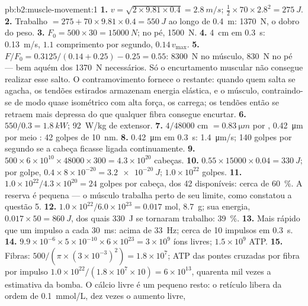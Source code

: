 \begin{solution}{pb:b2:muscle-movement:1}
\textbf{1.} $v = \sqrt{2\times 9.81\times 0.4} = \qty{2.8}{m/s}$;
$\tfrac12\times 70\times 2.8^{2} = \qty{275}{J}$.
\textbf{2.} Trabalho $= 275 + 70\times 9.81\times 0.4 = \qty{550}{J}$
ao longo de \qty{0.4}{m}: \qty{1370}{N}, o dobro do peso.
\textbf{3.} $F_0 = 500\times 30 = \qty{15000}{N}$; no pé,
\qty{1500}{N}.
\textbf{4.} \qty{4}{cm} em \qty{0.3}{s}: \qty{0.13}{m/s}, $1.1$
comprimento por segundo, $0.14\,v_{\max}$.
\textbf{5.} $F/F_0 = 0.3125/(0.14 + 0.25) - 0.25 = 0.55$: \qty{8300}{N}
no músculo, \qty{830}{N} no pé --- bem aquém dos \qty{1370}{N}
necessários. Só o encurtamento muscular não consegue realizar esse
salto. O contramovimento fornece o restante: quando quem salta se
agacha, os tendões estirados armazenam energia elástica, e o músculo,
contraindo-se de modo quase isométrico com alta força, os carrega; os
tendões então se retraem mais depressa do que qualquer fibra consegue
encurtar.
\textbf{6.} $550/0.3 = \qty{1.8}{kW}$; \qty{92}{W/kg} de extensor.
\textbf{7.} $4/\num{48000}$ cm $= \qty{0.83}{\micro m}$ por ,
\qty{0.42}{\micro m} por meio : 42 golpes de \qty{10}{nm}.
\textbf{8.} \qty{0.42}{\micro m} em \qty{0.3}{s}: \qty{1.4}{\micro m/s};
140 golpes por segundo se a cabeça ficasse ligada continuamente.
\textbf{9.} $500\times 6\times 10^{10}\times \num{48000}\times 300 =
4.3\times 10^{20}$ cabeças.
\textbf{10.} $0.55\times \num{15000}\times 0.04 = \qty{330}{J}$; por
golpe, $0.4\times 8\times 10^{-20} = \qty{3.2e-20}{J}$; $1.0\times
10^{22}$ golpes.
\textbf{11.} $1.0\times 10^{22}/4.3\times 10^{20} = 24$ golpes por
cabeça, dos 42 disponíveis: cerca de \qty{60}{\%}. A reserva é pequena
--- o músculo trabalha perto de seu limite, como constatou a questão 5.
\textbf{12.} $1.0\times 10^{22}/6.0\times 10^{23} = 0.017$ mol,
\qty{8.7}{g}; sua energia, $0.017\times 50 = \qty{860}{J}$, dos quais
\qty{330}{J} se tornaram trabalho: \qty{39}{\%}.
\textbf{13.} Mais rápido que um impulso a cada \qty{30}{ms}: acima de
\qty{33}{Hz}; cerca de 10 impulsos em \qty{0.3}{s}.
\textbf{14.} $9.9\times 10^{-6}\times 5\times 10^{-10}\times 6\times
10^{23} = 3\times 10^{9}$ íons livres; $1.5\times 10^{9}$ ATP.
\textbf{15.} Fibras: $500/(\pi\times(3\times 10^{-3})^{2}) = 1.8\times
10^{7}$; ATP das pontes cruzadas por fibra por impulso $1.0\times
10^{22}/(1.8\times 10^{7}\times 10) = 6\times 10^{13}$, quarenta mil
vezes a estimativa da bomba. O cálcio livre é um pequeno resto: o
retículo libera da ordem de \qty{0.1}{mmol/L}, dez vezes o aumento livre,

\end{solution}
